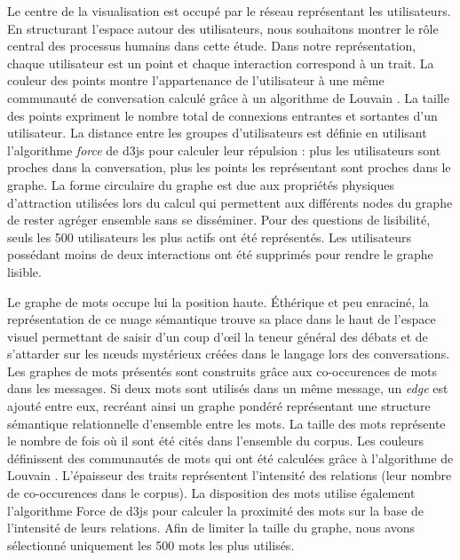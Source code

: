     Le centre de la visualisation est occupé par le réseau représentant les utilisateurs. En structurant l'espace autour des  utilisateurs, nous souhaitons montrer le r\^ole central des processus humains dans cette étude. Dans notre repr\'esentation, chaque utilisateur est un point et chaque interaction correspond \`a un trait. La couleur des points montre l{\textquoteright}appartenance de l{\textquoteright}utilisateur \`a une m\^eme communaut\'e de conversation calcul\'e gr\^ace \`a un algorithme de Louvain \citep{Blondel2008}. La taille des points expriment le nombre total de connexions entrantes et sortantes d{\textquoteright}un utilisateur. La distance entre les groupes d{\textquoteright}utilisateurs est d\'efinie en utilisant l{\textquoteright}algorithme \textit{force} de d3js \citep{Bostock2011} pour calculer leur r\'epulsion : plus les utilisateurs sont proches dans la conversation, plus les points les repr\'esentant sont proches dans le graphe. La forme circulaire du graphe est due aux propri\'et\'es physiques d{\textquoteright}attraction utilis\'ees lors du calcul qui permettent aux diff\'erents nodes du graphe de rester agr\'eger ensemble sans se diss\'eminer. Pour des questions de lisibilit\'e, seuls les 500 utilisateurs les plus actifs ont \'et\'e repr\'esent\'es. Les utilisateurs poss\'edant moins de deux interactions ont \'et\'e supprim\'es pour rendre le graphe lisible. 
    
    Le graphe de mots occupe lui la position haute. Éthérique et peu enraciné, la représentation de ce nuage sémantique trouve sa place dans le haut de l'espace visuel permettant de saisir d'un coup d’œil la teneur général des débats et de s'attarder sur les nœuds mystérieux créées dans le langage lors des conversations. Les graphes de mots pr\'esent\'es sont construits gr\^ace aux co-occurences de mots dans les messages. Si deux mots sont utilis\'es dans un m\^eme message, un \textit{edge} est ajout\'e entre eux, recr\'eant ainsi un graphe pond\'er\'e repr\'esentant une structure s\'emantique relationnelle d{\textquoteright}ensemble entre les mots. La taille des mots repr\'esente le nombre de fois o\`u il sont \'et\'e cit\'es dans l{\textquoteright}ensemble du corpus. Les couleurs d\'efinissent des communaut\'es de mots qui ont \'et\'e calcul\'ees gr\^ace \`a l{\textquoteright}algorithme de Louvain \citep{Blondel2008}. L{\textquoteright}\'epaisseur des traits repr\'esentent l{\textquoteright}intensit\'e des relations (leur nombre de co-occurences dans le corpus). La disposition des mots utilise \'egalement l{\textquoteright}algorithme Force de d3js \citep{Bostock2011} pour calculer la proximit\'e des mots sur la base de l{\textquoteright}intensit\'e de leurs relations. Afin de limiter la taille du graphe, nous avons s\'electionn\'e uniquement les 500 mots les plus utilis\'es.  


